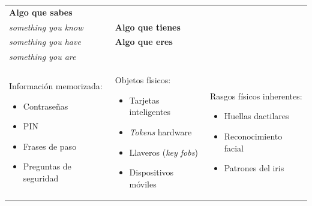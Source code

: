 \documentclass[11pt,a4paper]{report}
\begin{document}
\begin{center}
\small
{\setlength{\aboverulesep}{0pt}\setlength{\belowrulesep}{0pt}\renewcommand{\arraystretch}{1.3}%
\begin{tabularx}{\linewidth}{>{\raggedright\arraybackslash}X !{\color{gray!45}\vrule width 0.2pt} >{\raggedright\arraybackslash}X !{\color{gray!45}\vrule width 0.2pt} >{\raggedright\arraybackslash}X}
\toprule
\centering\textbf{Algo que sabes}\\\centering\emph{something you know} & \centering\textbf{Algo que tienes}\\\centering\emph{something you have} & \centering\arraybackslash\textbf{Algo que eres}\\\centering\arraybackslash\emph{something you are} \\
\midrule
Información memorizada:
\vspace{-0.3\baselineskip}\begin{itemize}[leftmargin=*,nosep,topsep=0pt]
  \item Contraseñas
  \item PIN
  \item Frases de paso
  \item Preguntas de seguridad
\end{itemize}\vspace{2pt}
&
Objetos físicos:
\vspace{-0.3\baselineskip}\begin{itemize}[leftmargin=*,nosep,topsep=0pt]
  \item Tarjetas inteligentes
  \item \emph{Tokens} hardware
  \item Llaveros (\emph{key fobs})
  \item Dispositivos móviles
\end{itemize}\vspace{2pt}
&
Rasgos físicos inherentes:
\vspace{-0.3\baselineskip}\begin{itemize}[leftmargin=*,nosep,topsep=0pt]
  \item Huellas dactilares
  \item Reconocimiento facial
  \item Patrones del iris
\end{itemize}\vspace{2pt} \\
\bottomrule
\end{tabularx}}
\end{center}
 
\end{document}
